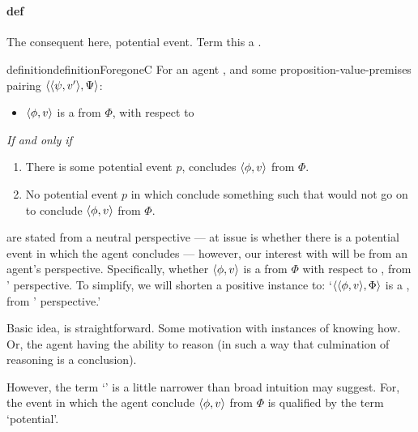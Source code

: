 \section{}
\label{cha:sec:fcs-def}

\paragraph{\fc{} def}

\begin{note}
  The consequent here, potential event.
  Term this a \fc{}.

  \begin{restatable}{definition}{definitionForegoneC}
    \label{def:fc}
    For an agent \vAgent{}, and some proposition-value-premises pairing \(\langle \langle \psi, v' \rangle, \Psi \rangle\):

    \begin{itemize}
    \item
      \(\langle \phi, v \rangle\) is a \emph{} from \(\Phi\), with respect to \vAgent{}
    \end{itemize}
    \emph{If and only if}
    \begin{enumerate}[label=\alph*., ref=(\alph*)]
    \item
      \label{def:fc:is-pe-good}
      There is some potential event \(p\), \vAgent{} concludes \(\langle \phi, v \rangle\) from \(\Phi\).
    \item
      \label{def:fc:no-pe-bad}
      No potential event \(p\) in which \vAgent{} conclude something such that would not go on to conclude \(\langle \phi, v \rangle\) from \(\Phi\).
    \end{enumerate}
  \end{restatable}

   are stated from a neutral perspective --- at issue is whether there is a potential event in which the agent concludes --- however, our interest with  will be from an agent's perspective.
  Specifically, whether \(\langle \phi, v \rangle\) is a  from \(\Phi\) with respect to \vAgent{}, from \vAgent{}' perspective.
  To simplify, we will shorten a positive instance to:
  `\(\langle \langle \phi, v \rangle, \Phi \rangle\) is a , from \vAgent{}' perspective.'
\end{note}

\begin{note}
  Basic idea, is straightforward.
  Some motivation with instances of knowing how.
  Or, the agent having the ability to reason (in such a way that culmination of reasoning is a conclusion).

  However, the term `' is a little narrower than broad intuition may suggest.
  For, the event in which the agent conclude \(\langle \phi, v \rangle\) from \(\Phi\) is qualified by the term `potential'.
\end{note}

